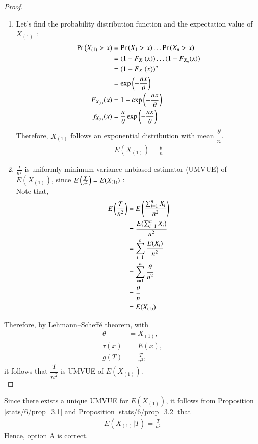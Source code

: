 \begin{proof}
\begin{enumerate}
\item Let's find the probability distribution function and the expectation value of $X_{(1)}$ : 
\begin{align}
\Pr\left(X_{(1)} > x\right) &= \Pr\left(X_1 > x\right)\ldots \Pr\left(X_n > x\right)\\
&= (1-F_{X_{1}}(x))\ldots(1-F_{X_{n}}(x))\\
&= (1-F_{X_{1}}(x))^n \\
&= \exp\left(-\frac{nx}{\theta}\right)\\
F_{X_{(1)}}(x) &= 1 - \exp\left(-\frac{nx}{\theta}\right)\\
f_{X_{(1)}}(x) &= \frac{n}{\theta} \exp\left(-\frac{nx}{\theta}\right)
\end{align}
Therefore, $X_{(1)}$ follows an exponential distribution with mean $\dfrac{\theta}{n}$.
\begin{align}
E(X_{(1)}) = \frac{\theta}{n}
\end{align}
\item $\frac{T}{n^2}$ is uniformly minimum-variance unbiased estimator (UMVUE) of $E(X_{(1)})$, since $E\left(\frac{T}{n^2}\right) = E(X_{(1)})$ : \\
Note that,
\begin{align}
E\left(\frac{T}{n^2}\right) &= E\left(\frac{\sum_{i=1}^n X_i}{n^2}\right)\\
&= \frac{E(\sum_{i=1}^n X_i)}{n^2}\\
&= \sum_{i=1}^n \frac{E(X_i)}{n^2}\\
&= \sum_{i=1}^n \frac{\theta}{n^2}\\
&= \frac{\theta}{n}\\
&= E(X_{(1)})
\end{align}
\end{enumerate}
Therefore, by Lehmann–Scheffé theorem, with
\begin{align}
\theta &= X_{(1)},\\
\tau(x) &= E(x),\\
g(T) &= \frac{T}{n^2},
\end{align}
it follows that $\dfrac{T}{n^2}$ is UMVUE of $E(X_{(1)})$.\\
\end{proof}
Since there exists a unique UMVUE for $E(X_{(1)})$, it follows from Proposition \ref{stats/6/prop_3.1} and Proposition \ref{stats/6/prop_3.2} that 
\begin{align}
E(X_{(1)} | T) = \frac{T}{n^2} 
\end{align}
Hence, option A is correct.

